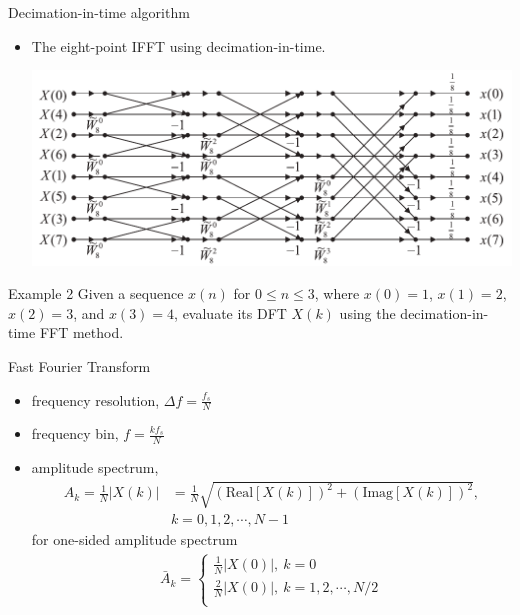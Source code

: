 \documentclass[pdflatex,compress,mathserif]{beamer}
\begin{document}
\begin{frame}{Decimation-in-time algorithm}
	\begin{itemize}
		\item The eight-point IFFT using decimation-in-time.
		\begin{center}
			\includegraphics[width=\linewidth]{img/img31}
		\end{center}
	\end{itemize}
\end{frame}

\begin{frame}{Example 2}
	Given a sequence $x(n)$ for $0 \leq n \leq 3$, where $x(0) = 1$, $x(1) = 2$, $x(2) = 3$, and $x(3) = 4$, evaluate its DFT $X(k)$ using the decimation-in-time FFT method.
\end{frame}

\begin{frame}{Fast Fourier Transform}
	\begin{itemize}
		\item frequency resolution, $\Delta f = \frac{f_s}{N}$
		\item frequency bin, $f = \frac{kf_s}{N}$
		\item amplitude spectrum,
		\begin{align*}
			A_k = \frac{1}{N}|X(k)| &= \frac{1}{N}\sqrt{(\text{Real}[X(k)])^2 + (\text{Imag}[X(k)])^2},\\
			&k=0,1,2,\cdots,N-1
		\end{align*}
		for one-sided amplitude spectrum
		\begin{align*}
			\bar{A}_k = \begin{cases}
				\frac{1}{N}|X(0)|,~k=0 \\
				\frac{2}{N}|X(0)|,~k=1,2,\cdots,N/2 \\
			\end{cases}
		\end{align*}
	\end{itemize}
\end{frame}
\end{document}
